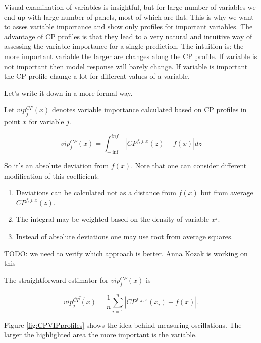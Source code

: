 \documentclass[]{krantz}
\providecommand{\tightlist}{%
  \setlength{\itemsep}{0pt}\setlength{\parskip}{0pt}}
\theoremstyle{definition}
\theoremstyle{definition}
\theoremstyle{definition}
\theoremstyle{remark}
\begin{document}
Visual examination of variables is insightful, but for large number of
variables we end up with large number of panels, most of which are flat.
This is why we want to asses variable importance and show only profiles
for important variables. The advantage of CP profiles is that they lead
to a very natural and intuitive way of assessing the variable importance
for a single prediction. The intuition is: the more important variable
the larger are changes along the CP profile. If variable is not
important then model response will barely change. If variable is
important the CP profile change a lot for different values of a
variable.

Let's write it down in a more formal way.

Let \(vip^{CP}_j(x)\) denotes variable importance calculated based on CP
profiles in point \(x\) for variable \(j\).

\[
vip^{CP}_j(x) = \int_{-\inf}^{inf} |CP^{f,j,x}(z) - f(x)| dz
\]

So it's an absolute deviation from \(f(x)\). Note that one can consider
different modification of this coefficient:

\begin{enumerate}
\def\labelenumi{\arabic{enumi}.}
\tightlist
\item
  Deviations can be calculated not as a distance from \(f(x)\) but from
  average \(\bar CP^{f,j,x}(z)\).
\item
  The integral may be weighted based on the density of variable \(x^j\).
\item
  Instead of absolute deviations one may use root from average squares.
\end{enumerate}

TODO: we need to verify which approach is better. Anna Kozak is working
on this

The straightforward estimator for \(vip^{CP}_j(x)\) is

\[
\widehat{ vip^{CP}_j(x)} = \frac 1n \sum_{i=1}^n |CP^{f,j,x}(x_i) - f(x)|.
\]

Figure \ref{fig:CPVIPprofiles} shows the idea behind measuring
oscillations. The larger the highlighted area the more important is the
variable.
\end{document}
